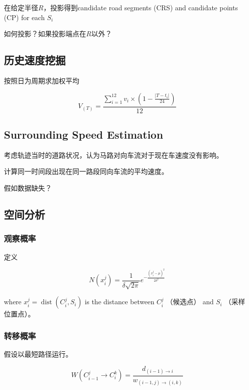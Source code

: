 在给定半径$R$，投影得到candidate road segments (CRS) and candidate points (CP) for each $S_i$

\begin{remark}
    如何投影？如果投影端点在$R$以外？
\end{remark}

\subsection{历史速度挖掘}

按照日为周期求加权平均

$$ V_{(T)}=\frac{\sum_{i=1}^{12} v_{i} \times\left(1-\frac{\left|T-t_{i}\right|}{24}\right)}{12} $$

\subsection{Surrounding Speed Estimation}

考虑轨迹当时的道路状况，认为马路对向车流对于现在车速度没有影响。

计算同一时间段出现在同一路段同向车流的平均速度。

\begin{remark}
    假如数据缺失？
\end{remark}

\subsection{空间分析}

\subsubsection{观察概率}

定义

$$ N\left(x_{i}^{j}\right)=\frac{1}{\delta \sqrt{2 \pi}} e^{-\frac{\left(x_{i}^{j}-\mu\right)^{2}}{2 \delta^{2}}} $$

where $ x_{i}^{j}=\operatorname{dist}\left(C_{i}^{j}, S_{i}\right) $ is the distance between $ C_{i}^{j} $ （候选点） and $ S_{i} $ （采样位置点）。

\subsubsection{转移概率}

假设以最短路径运行。

$$ W\left(C_{i-1}^{j} \rightarrow C_{i}^{k}\right)=\frac{d_{(i-1) \rightarrow i}}{w_{(i-1, j) \rightarrow(i, k)}} $$

